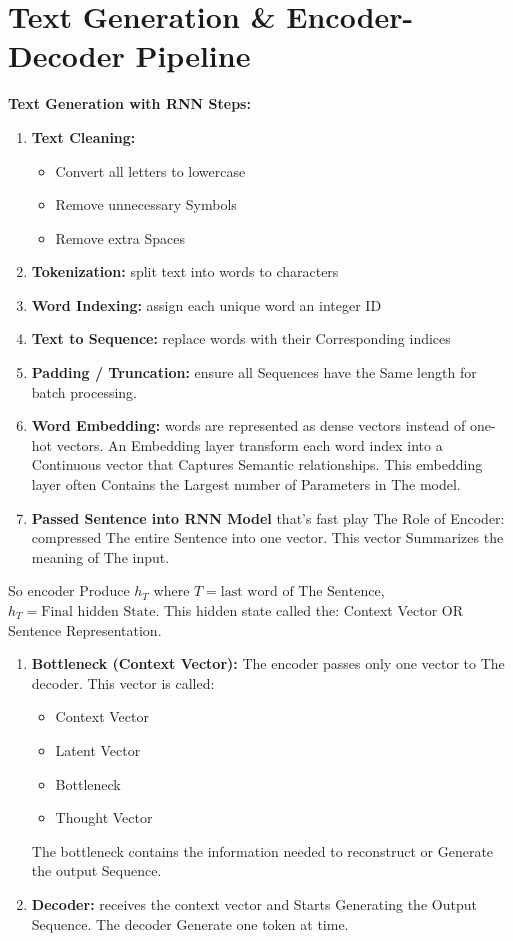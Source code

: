 \section{Text Generation \& Encoder-Decoder Pipeline}

\textbf{Text Generation with RNN Steps:}

\begin{enumerate}
    \item \textbf{Text Cleaning:}
    \begin{itemize}
        \item Convert all letters to lowercase
        \item Remove unnecessary Symbols
        \item Remove extra Spaces
    \end{itemize}
    \item \textbf{Tokenization:} split text into words to characters
    \item \textbf{Word Indexing:} assign each unique word an integer ID
    \item \textbf{Text to Sequence:} replace words with their Corresponding indices
    \item \textbf{Padding / Truncation:} ensure all Sequences have the Same length for batch processing.
    \item \textbf{Word Embedding:} words are represented as dense vectors instead of one-hot vectors. An Embedding layer transform each word index into a Continuous vector that Captures Semantic relationships. This embedding layer often Contains the Largest number of Parameters in The model.
    \item \textbf{Passed Sentence into RNN Model} that's fast play The Role of Encoder: compressed The entire Sentence into one vector. This vector Summarizes the meaning of The input.
\end{enumerate}

So encoder Produce $h_T$ where $T = \text{last word of The Sentence}$, $h_T = \text{Final hidden State}$.
This hidden state called the: Context Vector OR Sentence Representation.

\begin{enumerate}[resume]
    \item \textbf{Bottleneck (Context Vector):} The encoder passes only one vector to The decoder. This vector is called:
    \begin{itemize}
        \item Context Vector
        \item Latent Vector
        \item Bottleneck
        \item Thought Vector
    \end{itemize}
    The bottleneck contains the information needed to reconstruct or Generate the output Sequence.
    \item \textbf{Decoder:} receives the context vector and Starts Generating the Output Sequence. The decoder Generate one token at time.
\end{enumerate}

